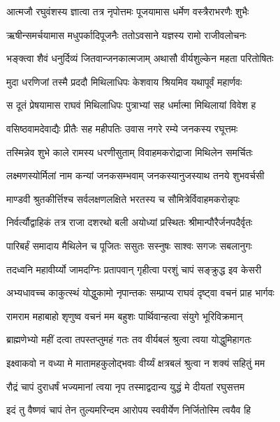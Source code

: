 \twolineshloka
{आत्मजौ रघुवंशस्य ज्ञात्वा तत्र नृपोत्तमः}
{पूजयामास धर्मेण वस्त्रैराभरणैः शुभैः}%

\twolineshloka
{ऋषीन्समर्चयामास मधुपर्कादिपूजनैः}
{ततोऽवसाने यज्ञस्य रामो राजीवलोचनः}%

\twolineshloka
{भङ्क्त्वा शैवं धनुर्दिव्यं जितवान्जनकात्मजाम्}
{अथासौ वीर्यशुल्केन महता परितोषितः}%

\twolineshloka
{मुदा धरणिजां तस्मै प्रददौ मिथिलाधिपः}
{केशवाय श्रियमिव यथापूर्वं महार्णवः}%

\twolineshloka
{स दूतं प्रेषयामास राघवं मिथिलाधिपः}
{पुत्राभ्यां सह धर्मात्मा मिथिलायां विवेश ह}%

\twolineshloka
{वसिष्ठवामदेवाद्यैः प्रीतैः सह महीपतिः}
{उवास नगरे रम्ये जनकस्य रघूत्तमः}%

\twolineshloka
{तस्मिन्नेव शुभे काले रामस्य धरणीसुताम्}
{विवाहमकरोद्राजा मिथिलेन समर्चितः}%

\twolineshloka
{लक्ष्मणस्योर्मिलां नाम कन्यां जनकसम्भवाम्}
{जनकस्यानुजस्याथ तनये शुभवर्चसी}%

\twolineshloka
{माण्डवी श्रुतकीर्त्तिश्च सर्वलक्षणलक्षिते}
{भरतस्य च सौमित्रेर्विवाहमकरोन्नृपः}%

\twolineshloka
{निर्वर्त्यौद्वाहिकं तत्र राजा दशरथो बली}
{अयोध्यां प्रस्थितः श्रीमान्पौरैर्जनपदैर्वृतः}%

\twolineshloka
{पारिबर्हं समादाय मैथिलेन च पूजितः}
{ससुतः सस्नुषः साश्वः सगजः सबलानुगः}%

\twolineshloka
{तदध्वनि महावीर्य्यो जामदग्निः प्रतापवान्}
{गृहीत्वा परशुं चापं सङ्क्रुद्ध इव केसरी}%

\twolineshloka
{अभ्यधावच्च काकुत्स्थं योद्धुकामो नृपान्तकः}
{सम्प्राप्य राघवं दृष्ट्वा वचनं प्राह भार्गवः}%


\twolineshloka
{रामराम महाबाहो शृणुष्व वचनं मम}
{बहुशः पार्थिवान्हत्वा संयुगे भूरिविक्रमान्}%

\twolineshloka
{ब्राह्मणेभ्यो महीं दत्वा तपस्तप्तुमहं गतः}
{तव वीर्यबलं श्रुत्वा त्वया योद्धुमिहागतः}%

\twolineshloka
{इक्ष्वाकवो न वध्या मे मातामहकुलोद्भवाः}
{वीर्य्यं क्षत्रबलं श्रुत्वा न शक्यं सहितुं मम}%

\twolineshloka
{रौद्रं चापं दुराधर्षं भज्यमानां त्वया नृप}
{तस्माद्वदान्य युद्धं मे दीयतां रघुसत्तम}%

\twolineshloka
{इदं तु वैष्णवं चापं तेन तुल्यमरिन्दम}
{आरोपय स्ववीर्येण निर्जितोस्मि त्वयैव हि}%

